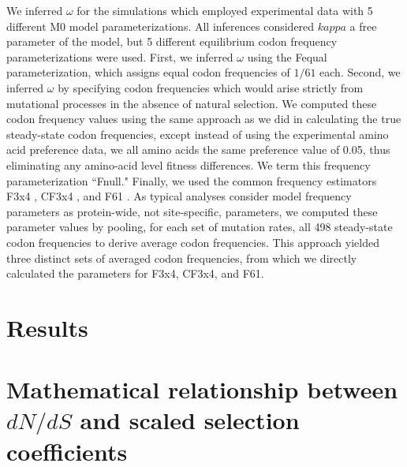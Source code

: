 \documentclass[11pt]{article}
\begin{document}
We inferred $\omega$ for the simulations which employed experimental data with 5 different M0 model parameterizations. All inferences considered $kappa$ a free parameter of the model, but 5 different equilibrium codon frequency parameterizations were used. First, we inferred $\omega$ using the Fequal \cite{Yang2006} parameterization, which assigns equal codon frequencies of $1/61$ each. Second, we inferred $\omega$ by specifying codon frequencies which would arise strictly from mutational processes in the absence of natural selection. We computed these codon frequency values using the same approach as we did in calculating the true steady-state codon frequencies, except instead of using the experimental amino acid preference data, we all amino acids the same preference value of 0.05, thus eliminating any amino-acid level fitness differences. We term this frequency parameterization ``Fnull." Finally, we used the common frequency estimators F3x4 \cite{MuseGaut1994}, CF3x4 \cite{Pond2010}, and F61 \cite{GoldmanYang1994}. As typical analyses consider model frequency parameters as protein-wide, not site-specific, parameters, we computed these parameter values by pooling, for each set of mutation rates, 
all 498 steady-state codon frequencies to derive average codon frequencies. This approach yielded three distinct sets of averaged codon frequencies, from which we directly calculated the parameters for F3x4, CF3x4, and F61.








\section*{Results}


\section*{Mathematical relationship between $dN/dS$ and scaled selection coefficients}
\end{document}
